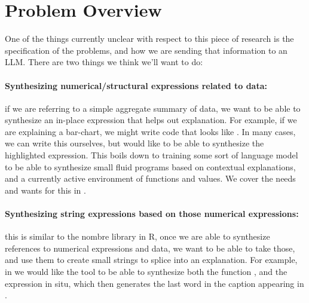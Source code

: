 \section{Problem Overview}
One of the things currently unclear with respect to this piece of research is the
specification of the problems, and how we are sending that information to an LLM.
There are two things we think we'll want to do:

\paragraph*{Synthesizing numerical/structural expressions related to data:}

if we are referring to a simple aggregate summary of data, we want to be able
to synthesize an in-place expression that helps out explanation. For example,
if we are explaining a bar-chart, we might write code that looks like .
In many cases, we can write this ourselves, but would like to be able to
synthesize the highlighted expression. This boils down to training some sort of
language model to be able to synthesize small fluid programs based on contextual
explanations, and a currently active environment of functions and values. We cover
the needs and wants for this in .

\paragraph*{Synthesizing string expressions based on those numerical expressions:}
this is similar to the nombre library in R, once we are able to synthesize references
to numerical expressions and data, we want to be able to take those, and use them to
create small strings to splice into an explanation. For example, in 
we would like the tool to be able to synthesize both the function , and
the expression in situ, which then generates the last word in the caption appearing in
.
